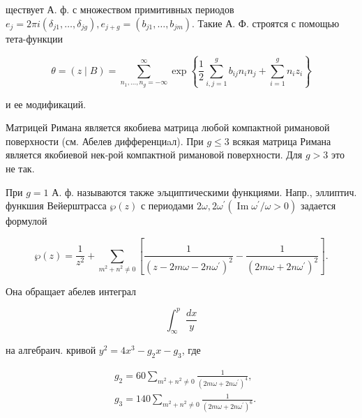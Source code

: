 \documentclass[10pt]{article}
\begin{document}
ществует А. ф. с множеством примитивных периодов $e_{j}=2 \pi i\left(\delta_{j 1}, \ldots, \delta_{j g}\right), e_{j+g}=\left(b_{j 1}, \ldots, b_{j m}\right)$. Такие А. Ф. строятся с помощью тета-функции



\[

\theta=(z \mid B)=\sum_{n_{1}, \ldots, n_{g}=-\infty}^{\infty} \exp \left\{\frac{1}{2} \sum_{i, j=1}^{g} b_{i j} n_{i} n_{j}+\sum_{i=1}^{g} n_{i} z_{i}\right\}

\]



и ее модификаций.



Матрицей Римана является якобиева матрица любой компактной римановой поверхности (см. Абелев дифференциaл). При $g \leqslant 3$ всякая матрица Римана является якобиевой нек-рой компактной римановой поверхности. Для $g>3$ это не так.



При $g=1$ А. ф. называются также эљциптическими функциями. Напр., эллиптич. функшия Вейерштрасса $\wp(z)$ с периодами $2 \omega, 2 \omega^{\prime}\left(\operatorname{Im} \omega^{\prime} / \omega>0\right)$ задается формулой



\[

\wp(z)=\frac{1}{z^{2}}+\sum_{m^{2}+n^{2} \neq 0}\left[\frac{1}{\left(z-2 m \omega-2 n \omega^{\prime}\right)^{2}}-\frac{1}{\left(2 m \omega+2 n \omega^{\prime}\right)^{2}}\right] .

\]



Она обращает абелев интеграл



\[

\int_{\infty}^{p} \frac{d x}{y}

\]



на алгебраич. кривой $y^{2}=4 x^{3}-g_{2} x-g_{3}$, где



\[

\begin{aligned}

& g_{2}=60 \sum_{m^{2}+n^{2} \neq 0} \frac{1}{\left(2 m \omega+2 n \omega^{\prime}\right)^{4}}, \\

& g_{3}=140 \sum_{m^{2}+n^{2} \neq 0} \frac{1}{\left(2 m \omega+2 n \omega^{\prime}\right)^{6}} .

\end{aligned}

\]
\end{document}
